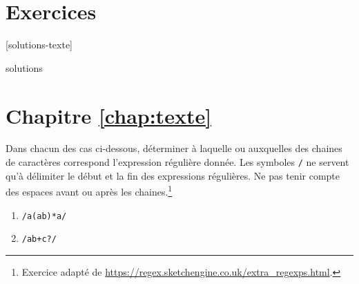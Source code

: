 \section{Exercices}
\label{sec:texte:exercices}

[solutions-texte]

\begin{Filesave}{solutions}
\section*{Chapitre \ref*{chap:texte}}

\end{Filesave}

\begin{exercice}
  Dans chacun des cas ci-dessous, déterminer à laquelle ou auxquelles
  des chaines de caractères correspond l'expression régulière donnée.
  Les symboles \verb=/= ne servent qu'à délimiter le début et la fin
  des expressions régulières. Ne pas tenir compte des espaces avant ou
  après les chaines.\footnote{%
    Exercice adapté de
    \url{https://regex.sketchengine.co.uk/extra_regexps.html}.}
  \begin{enumerate}
    \setlength{\multicolsep}{2pt}
  \item \verb~/a(ab)*a/~
    \begin{enumerate}[1)]
    \end{enumerate}
  \item \verb~/ab+c?/~
    \begin{enumerate}[1)]
      \begin{multicols}{3}

\end{multicols}
\end{enumerate}
\end{enumerate}
\end{exercice}

